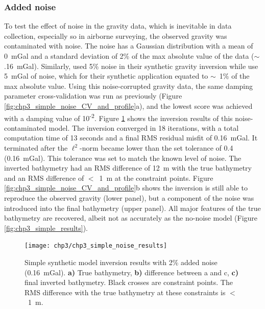 \subsubsection{Added noise}
To test the effect of noise in the gravity data, which is inevitable in data collection, especially so in airborne surveying, the observed gravity was contaminated with noise. The noise has a Gaussian distribution with a mean of 0~mGal and a standard deviation of 2\% of the max absolute value of the data ($\sim$ .16~mGal). Similarly, \citet{rashidifardconstraining2021} used 5\% noise in their synthetic gravity inversion while \citet{uiedafast2017} use 5~mGal of noise, which for their synthetic application equated to $\sim$~1\% of the max absolute value. Using this noise-corrupted gravity data, the same damping parameter cross-validation was run as previously (Figure \ref{fig:chp3_simple_noise_CV_and_profile}a), and the lowest score was achieved with a damping value of 10\textsuperscript{-2}. Figure \ref{fig:chp3_simple_noise_results} shows the inversion results of this noise-contaminated model. 
The inversion converged in 18 iterations, with a total computation time of 13 seconds and a final RMS residual misfit of 0.16~mGal. It terminated after the $\ell^2$-norm became lower than the set tolerance of 0.4 (0.16~mGal). This tolerance was set to match the known level of noise. The inverted bathymetry had an RMS difference of 12~m with the true bathymetry and an RMS difference of $<$~1~m at the constraint points. Figure \ref{fig:chp3_simple_noise_CV_and_profile}b shows the inversion is still able to reproduce the observed gravity (lower panel), but a component of the noise was introduced into the final bathymetry (upper panel). All major features of the true bathymetry are recovered, albeit not as accurately as the no-noise model (Figure \ref{fig:chp3_simple_results}).

\begin{figure}[!ht]
    \centering
    \texttt{[image: chp3/chp3\_simple\_noise\_results]}
    \caption[Synthetic inversion with noise]{Simple synthetic model inversion results with 2\% added noise (0.16~mGal). \textbf{a)} True bathymetry, \textbf{b)} difference between a and c, \textbf{c)} final inverted bathymetry. Black crosses are constraint points. The RMS difference with the true bathymetry at these constraints is $<$~1~m.}
    \label{fig:chp3_simple_noise_results}
\end{figure}

